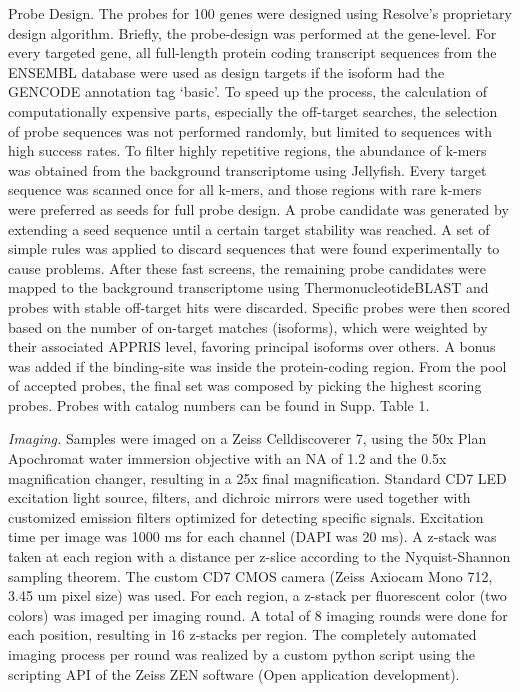 Probe Design. The probes for 100 genes were designed using Resolve's proprietary design algorithm. Briefly, the probe-design was performed at the gene-level. For every targeted gene, all full-length protein coding transcript sequences from the ENSEMBL database were used as design targets if the isoform had the GENCODE annotation tag `basic'\cite{frankishGENCODEReferenceAnnotation2019,yatesEnsembl20202019}. To speed up the process, the calculation of computationally expensive parts, especially the off-target searches, the selection of probe sequences was not performed randomly, but limited to sequences with high success rates. To filter highly repetitive regions, the abundance of k-mers was obtained from the background transcriptome using Jellyfish\cite{marcaisFastLockfreeApproach2011}. Every target sequence was scanned once for all k-mers, and those regions with rare k-mers were preferred as seeds for full probe design. A probe candidate was generated by extending a seed sequence until a certain target stability was reached. A set of simple rules was applied to discard sequences that were found experimentally to cause problems. After these fast screens, the remaining probe candidates were mapped to the background transcriptome using ThermonucleotideBLAST\cite{gansImprovedAssaydependentSearching2008} and probes with stable off-target hits were discarded. Specific probes were then scored based on the number of on-target matches (isoforms), which were weighted by their associated APPRIS level\cite{rodriguezAPPRIS2017Principal2018}, favoring principal isoforms over others. A bonus was added if the binding-site was inside the protein-coding region. From the pool of accepted probes, the final set was composed by picking the highest scoring probes. Probes with catalog numbers can be found in Supp. Table 1\cite{mahBentoToolkitSubcellular2022}. 

\textit{Imaging.} Samples were imaged on a Zeiss Celldiscoverer 7, using the 50x Plan Apochromat water immersion objective with an NA of 1.2 and the 0.5x magnification changer, resulting in a 25x final magnification. Standard CD7 LED excitation light source, filters, and dichroic mirrors were used together with customized emission filters optimized for detecting specific signals. Excitation time per image was 1000 ms for each channel (DAPI was 20 ms). A z-stack was taken at each region with a distance per z-slice according to the Nyquist-Shannon sampling theorem. The custom CD7 CMOS camera (Zeiss Axiocam Mono 712, 3.45 um pixel size) was used. For each region, a z-stack per fluorescent color (two colors) was imaged per imaging round. A total of 8 imaging rounds were done for each position, resulting in 16 z-stacks per region. The completely automated imaging process per round was realized by a custom python script using the scripting API of the Zeiss ZEN software (Open application development).

